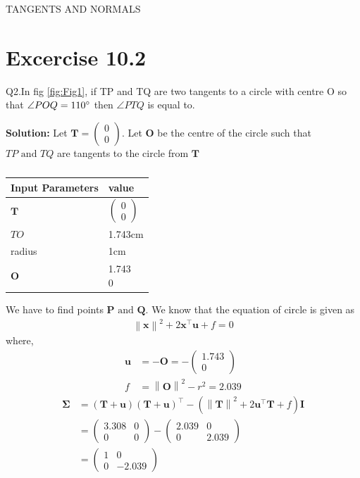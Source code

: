 \documentclass[12pt]{article}
\providecommand{\brak}[1]{\ensuremath{\left(#1\right)}}
\providecommand{\norm}[1]{\left\lVert#1\right\rVert}
\newcommand{\solution}{\noindent \textbf{Solution: }}
\newcommand{\myvec}[1]{\ensuremath{\begin{pmatrix}#1\end{pmatrix}}}
\let\vec\mathbf
\begin{document}
\begin{center}
\textbf\large{TANGENTS AND NORMALS}

\end{center}
\section*{Excercise 10.2}
Q2.In fig \ref{fig:Fig1}, if TP and TQ are two tangents to a circle with centre O so that $\angle{POQ} = 110\degree$ then $\angle{PTQ}$ is equal to.

\solution
Let $\vec{T} = \myvec{0\\0}$. Let $\vec{O}$ be the centre of the circle such that $TP \text{ and } TQ$ are tangents to the circle from $\vec{T}$
\begin{table}[h!]
\begin{center}
\begin{tabular}{|m{4cm}|m{2cm}|}
	\hline
	\textbf{Input Parameters} & \textbf{value}\\ 
	\hline
	$\vec{T}$ & $\myvec{0\\0}$\\
	\hline
	$TO$ & 1.743cm\\
	\hline
	radius & 1cm\\
	\hline
	$\vec{O}$ & \myvec{1.743\\0}\\
	\hline
\end{tabular}
\caption{}
\label{table:Table1}
\end{center}
\end{table}
We have to find points $\vec{P} \text{ and } \vec{Q}$. We know that the equation of circle is given as
\begin{align}
	\norm{\vec{x}}^2+2\vec{x}^\top \vec{u}+f=0
\end{align}
where,
\begin{align}
	\vec{u} &= -\vec{O} = -\myvec{1.743\\0}\\
	f &= \norm{\vec{O}}^2 - r^2 = 2.039
\end{align}
\begin{align}
	\vec{\Sigma} &= \brak{\vec{T}+\vec{u}}\brak{\vec{T}+\vec{u}}^\top - \brak{\norm{\vec{T}}^2 + 2\vec{u}^\top \vec{T}+f}\vec{I}\\
	&=\myvec{3.308&0 \\ 0&0} - \myvec{2.039&0 \\ 0&2.039}\\
	\label{eq:eq1}
	&=\myvec{1&0\\0&-2.039}
\end{align}
\end{document}

